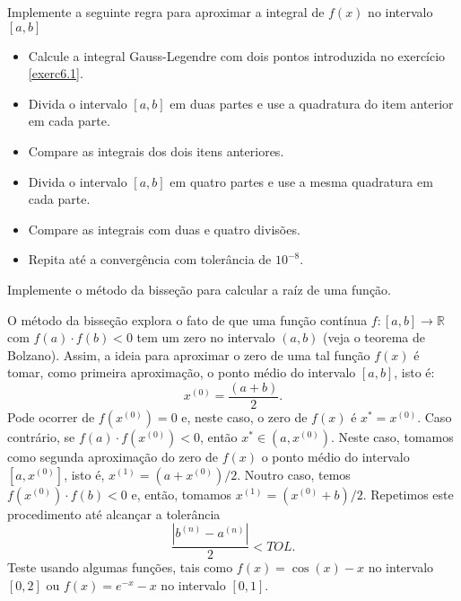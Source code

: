 \begin{exer}
 Implemente a seguinte regra para aproximar a integral de $f(x)$ no intervalo $[a,b]$
 \begin{itemize}
  \item Calcule a integral Gauss-Legendre com dois pontos introduzida no exercício \ref{exerc6.1}.
  \item Divida o intervalo $[a,b]$ em duas partes e use a quadratura do item anterior em cada parte.
  \item Compare as integrais dos dois itens anteriores.
  \item Divida o intervalo $[a,b]$ em quatro partes e use a mesma quadratura em cada parte.
  \item Compare as integrais com duas e quatro divisões.
 \item Repita até a convergência com tolerância de $10^{-8}$.
  \end{itemize}

\end{exer}

\begin{exer}Implemente o método da bisseção para calcular a raíz de uma função.

O método da bisseção explora o fato de que uma função contínua $f:[a, b]\to \mathbb{R}$ com $f(a)\cdot f(b) < 0$ tem um zero no intervalo $(a, b)$ (veja o teorema de Bolzano). Assim, a ideia para aproximar o zero de uma tal função $f(x)$ é tomar, como primeira aproximação, o ponto médio do intervalo $[a, b]$, isto é:
\begin{equation*}
  x^{(0)} = \frac{(a + b)}{2}. 
\end{equation*}
Pode ocorrer de $f(x^{(0)}) = 0$ e, neste caso, o zero de $f(x)$ é $x^* = x^{(0)}$. Caso contrário, se $f(a)\cdot f(x^{(0)}) < 0$, então $x^*\in (a, x^{(0)})$. Neste caso, tomamos como segunda aproximação do zero de $f(x)$ o ponto médio do intervalo $[a, x^{(0)}]$, isto é, $x^{(1)} = (a + x^{(0)})/2$. Noutro caso, temos $f(x^{(0)})\cdot f(b) < 0$ e, então, tomamos $x^{(1)} = (x^{(0)} + b)/2$. Repetimos este procedimento até alcançar a tolerância
\begin{equation*}
  \displaystyle \frac{|b^{(n)} - a^{(n)}|}{2} < TOL.
\end{equation*}
Teste usando algumas funções, tais como $f(x)=\cos(x)-x$ no intervalo $[0,2]$ ou $f(x)=e^{-x}-x$ no intervalo $[0,1]$.
\end{exer}

